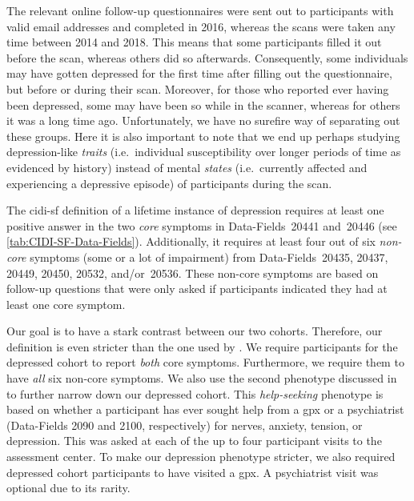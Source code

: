The relevant online follow-up questionnaires were sent out to participants with valid email addresses and completed in 2016, whereas the scans were taken any time between 2014 and 2018.
This means that some participants filled it out before the scan, whereas others did so afterwards.
Consequently, some individuals may have gotten depressed for the first time after filling out the questionnaire, but before or during their scan.
Moreover, for those who reported ever having been depressed, some may have been so while in the scanner, whereas for others it was a long time ago.
Unfortunately, we have no surefire way of separating out these groups.
Here it is also important to note that we end up perhaps studying depression-like \emph{traits} (i.e.~individual susceptibility over longer periods of time as evidenced by history) instead of mental \emph{states} (i.e.~currently affected and experiencing a depressive episode) of participants during the scan.

The \gls{cidi-sf} definition of a lifetime instance of depression requires at least one positive answer in the two \emph{core} symptoms in Data-Fields~20441 and~20446 (see \cref{tab:CIDI-SF-Data-Fields}).
Additionally, it requires at least four out of six \emph{non-core} symptoms (some or a lot of impairment) from Data-Fields~20435, 20437, 20449, 20450, 20532, and/or~20536.
These non-core symptoms are based on follow-up questions that were only asked if participants indicated they had at least one core symptom.



Our goal is to have a stark contrast between our two cohorts.
Therefore, our definition is even stricter than the one used by \textcite{Howard2020}.
We require participants for the depressed cohort to report \emph{both} core symptoms.
Furthermore, we require them to have \emph{all} six non-core symptoms.
We also use the second phenotype discussed in \textcite{Howard2020} to further narrow down our depressed cohort.
This \emph{help-seeking} phenotype is based on whether a participant has ever sought help from a \gls{gpx} or a psychiatrist (Data-Fields 2090 and 2100, respectively) for nerves, anxiety, tension, or depression.
This was asked at each of the up to four participant visits to the assessment center.
To make our depression phenotype stricter, we also required depressed cohort participants to have visited a \gls{gpx}.
A psychiatrist visit was optional due to its rarity.

